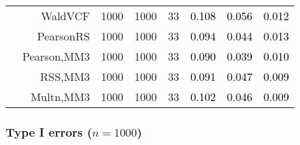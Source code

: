 \documentclass[
]{article}
\begin{document}
\begin{table}[H]
{\begin{tabular}[t]{lrrrrrrr}
\hspace{1em} & WaldVCF & 1000 & 1000 & 33 & \textcolor{black}{0.108} & \textcolor{black}{0.056} & \textcolor{black}{0.012}\\

\hspace{1em} & PearsonRS & 1000 & 1000 & 33 & \textcolor{black}{0.094} & \textcolor{black}{0.044} & \textcolor{black}{0.013}\\

\hspace{1em} & Pearson,MM3 & 1000 & 1000 & 33 & \textcolor{black}{0.090} & \textcolor{black}{0.039} & \textcolor{black}{0.010}\\

\hspace{1em} & RSS,MM3 & 1000 & 1000 & 33 & \textcolor{black}{0.091} & \textcolor{black}{0.047} & \textcolor{black}{0.009}\\

\hspace{1em} & Multn,MM3 & 1000 & 1000 & 33 & \textcolor{black}{0.102} & \textcolor{black}{0.046} & \textcolor{black}{0.009}\\
\bottomrule
\end{tabular}}
\endgroup{}
\end{table}

\hypertarget{type-i-errors-n1000}{%
\subsubsection{\texorpdfstring{Type I errors
(\(n=1000\))}{Type I errors (n=1000)}}\label{type-i-errors-n1000}}
\end{document}
